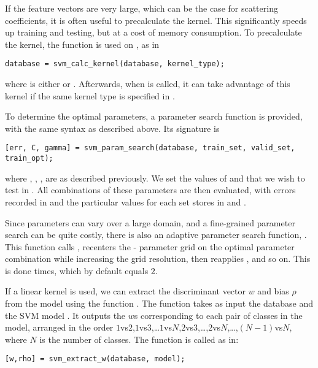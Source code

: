 \documentclass{article}
\begin{document}
If the feature vectors are very large, which can be the case for scattering coefficients, it is often useful to precalculate the kernel. This significantly speeds up training and testing, but at a cost of memory consumption. To precalculate the kernel, the function  is used on , as in
\begin{lstlisting}
database = svm_calc_kernel(database, kernel_type);
\end{lstlisting}
where  is either  or . Afterwards, when  is called, it can take advantage of this kernel if the same kernel type is specified in .

To determine the optimal parameters, a parameter search function  is provided, with the same syntax as described above. Its signature is
\begin{lstlisting}
[err, C, gamma] = svm_param_search(database, train_set, valid_set, train_opt);
\end{lstlisting}
where , , ,  are as described previously. We set the values of  and  that we wish to test in . All combinations of these parameters are then evaluated, with errors recorded in  and the particular values for each set stores in  and .

Since parameters can vary over a large domain, and a fine-grained parameter search can be quite costly, there is also an adaptive parameter search function, . This function calls , recenters the - parameter grid on the optimal parameter combination while increasing the grid resolution,  then reapplies , and so on. This is done  times, which by default equals $2$.

If a linear kernel is used, we can extract the discriminant vector $w$ and bias $\rho$ from the model using the function . The function takes as input the database  and the SVM model . It outputs the $w$s corresponding to each pair of classes in the model, arranged in the order $1$vs$2$,$1$vs$3$,\ldots$1$vs$N$,$2$vs$3$,\ldots,$2$vs$N$,\ldots,$(N-1)$vs$N$, where $N$ is the number of classes. The function is called as in:
\begin{lstlisting}
[w,rho] = svm_extract_w(database, model);
\end{lstlisting}
\end{document}
